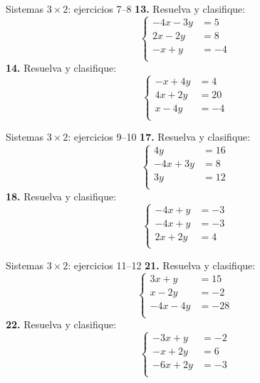 \documentclass[aspectratio=169]{beamer}
\begin{document}
\begin{frame}{Sistemas $3\times 2$: ejercicios 7--8}
\small
\textbf{13.} Resuelva y clasifique:
\[\left\{\begin{aligned}
-4x-3y&=5\\
2x-2y&=8\\
-x+y&=-4\\
\end{aligned}\right.\]
\textbf{14.} Resuelva y clasifique:
\[\left\{\begin{aligned}
-x+4y&=4\\
4x+2y&=20\\
x-4y&=-4\\
\end{aligned}\right.\]
\end{frame}
\begin{frame}{Sistemas $3\times 2$: ejercicios 9--10}
\small
\textbf{17.} Resuelva y clasifique:
\[\left\{\begin{aligned}
4y&=16\\
-4x+3y&=8\\
3y&=12\\
\end{aligned}\right.\]
\textbf{18.} Resuelva y clasifique:
\[\left\{\begin{aligned}
-4x+y&=-3\\
-4x+y&=-3\\
2x+2y&=4\\
\end{aligned}\right.\]
\end{frame}
\begin{frame}{Sistemas $3\times 2$: ejercicios 11--12}
\small
\textbf{21.} Resuelva y clasifique:
\[\left\{\begin{aligned}
3x+y&=15\\
x-2y&=-2\\
-4x-4y&=-28\\
\end{aligned}\right.\]
\textbf{22.} Resuelva y clasifique:
\[\left\{\begin{aligned}
-3x+y&=-2\\
-x+2y&=6\\
-6x+2y&=-3\\
\end{aligned}\right.\]
\end{frame}
\end{document}
